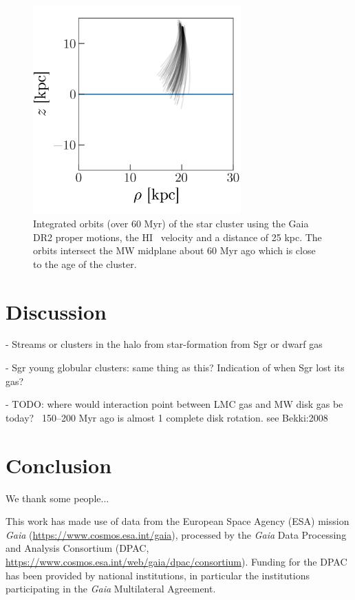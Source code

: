 \documentclass[modern]{aastex62}
\newcommand{\hi}{H{\footnotesize I} }
\begin{document}
\begin{figure}
\centering
\includegraphics[width=8cm]{orbits.png}
\caption{Integrated orbits (over 60 Myr) of the star cluster using the Gaia DR2 proper motions, the
\hi~velocity and a distance of 25 kpc.  The orbits intersect the MW midplane about
60 Myr ago which is close to the age of the cluster.}
\label{fig_gass}
\end{figure}

\section{Discussion} \label{sec:discussion}

- Streams or clusters in the halo from star-formation from Sgr or dwarf gas

- Sgr young globular clusters: same thing as this? Indication of when Sgr lost its gas?

- TODO: where would interaction point between LMC gas and MW disk gas be today? ~150–200 Myr ago is almost 1 complete disk rotation. see Bekki:2008

\section{Conclusion} \label{sec:conclusion}


\acknowledgments

We thank some people...

This work has made use of data from the European Space Agency (ESA)
mission {\it Gaia} (\url{https://www.cosmos.esa.int/gaia}), processed by
the {\it Gaia} Data Processing and Analysis Consortium (DPAC,
\url{https://www.cosmos.esa.int/web/gaia/dpac/consortium}). Funding
for the DPAC has been provided by national institutions, in particular
the institutions participating in the {\it Gaia} Multilateral Agreement.
\end{document}
